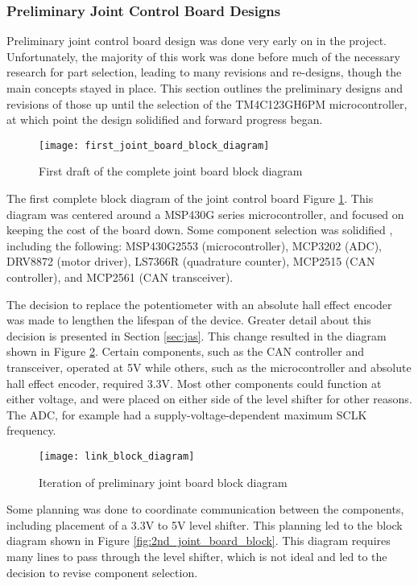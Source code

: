 \subsubsection{Preliminary Joint Control Board Designs}
\label{sec:pjcbd}
Preliminary joint control board design was done very early on in the project. Unfortunately, the majority of this work was done before much of the necessary research for part selection, leading to many revisions and re-designs, though the main concepts stayed in place. This section outlines the preliminary designs and revisions of those up until the selection of the TM4C123GH6PM microcontroller, at which point the design solidified and forward progress began. 

\begin{figure}[H]
	\centering
	\texttt{[image: first\_joint\_board\_block\_diagram]}
	\caption{First draft of the complete joint board block diagram}
	\label{fig:1st_joint_board_block}
\end{figure}

\noindent The first complete block diagram of the joint control board Figure \ref{fig:1st_joint_board_block}. This diagram was centered around a MSP430G series microcontroller, and focused on keeping the cost of the board down. Some component selection was solidified , including the following: MSP430G2553 (microcontroller), MCP3202 (ADC), DRV8872 (motor driver), LS7366R (quadrature counter), MCP2515 (CAN controller), and MCP2561 (CAN transceiver). 

\noindent The decision to replace the potentiometer with an absolute hall effect encoder was made to lengthen the lifespan of the device. Greater detail about this decision is presented in Section \ref{sec:jas}. This change resulted in the diagram shown in Figure \ref{fig:nice_prelim_joint_board_block}. Certain components, such as the CAN controller and transceiver, operated at 5V while others, such as the microcontroller and absolute hall effect encoder, required 3.3V. Most other components could function at either voltage, and were placed on either side of the level shifter for other reasons. The ADC, for example had a supply-voltage-dependent maximum SCLK frequency.
\begin{figure}[H]
	\centering
	\texttt{[image: link\_block\_diagram]}
	\caption{Iteration of preliminary joint board block diagram}
	\label{fig:nice_prelim_joint_board_block}
\end{figure}

\noindent Some planning was done to coordinate communication between the components, including placement of a 3.3V to 5V level shifter. This planning led to the block diagram shown in Figure \ref{fig:2nd_joint_board_block}. This diagram requires many lines to pass through the level shifter, which is not ideal and led to the decision to revise component selection.

